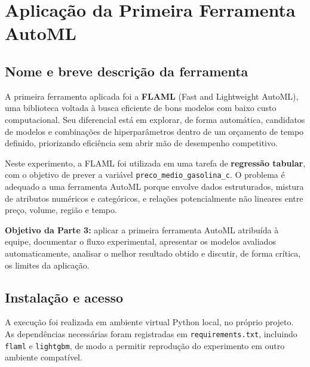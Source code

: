 \documentclass[11pt, a4paper, oneside]{article}
\begin{document}
\section{Aplicação da Primeira Ferramenta AutoML}
\label{sec:flaml}

\subsection{Nome e breve descrição da ferramenta}
\label{sec:flaml-descricao}

A primeira ferramenta aplicada foi a \textbf{FLAML} (Fast and Lightweight AutoML),
uma biblioteca voltada à busca eficiente de bons modelos com baixo custo
computacional. Seu diferencial está em explorar, de forma automática, candidatos de
modelos e combinações de hiperparâmetros dentro de um orçamento de tempo definido,
priorizando eficiência sem abrir mão de desempenho competitivo.

Neste experimento, a FLAML foi utilizada em uma tarefa de \textbf{regressão tabular},
com o objetivo de prever a variável \texttt{preco\_medio\_gasolina\_c}. O problema é
adequado a uma ferramenta AutoML porque envolve dados estruturados, mistura de
atributos numéricos e categóricos, e relações potencialmente não lineares entre preço,
volume, região e tempo.

\begin{infobox}
\textbf{Objetivo da Parte 3:} aplicar a primeira ferramenta AutoML atribuída à equipe,
documentar o fluxo experimental, apresentar os modelos avaliados automaticamente,
analisar o melhor resultado obtido e discutir, de forma crítica, os limites da
aplicação.
\end{infobox}

\subsection{Instalação e acesso}
\label{sec:flaml-instalacao}

A execução foi realizada em ambiente virtual Python local, no próprio projeto. As
dependências necessárias foram registradas em \texttt{requirements.txt}, incluindo
\texttt{flaml} e \texttt{lightgbm}, de modo a permitir reprodução do experimento em
outro ambiente compatível.
\end{document}
